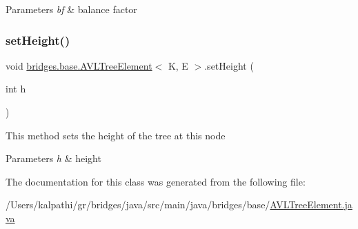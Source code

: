 \begin{DoxyParams}{Parameters}
{\em bf} & balance factor \\
\hline
\end{DoxyParams}
\mbox{\label{classbridges_1_1base_1_1_a_v_l_tree_element_ac42b744989ed7e18dcbd52980e674b33}} 
\subsubsection{\texorpdfstring{setHeight()}{setHeight()}}
{\footnotesize\ttfamily void \mbox{\hyperlink{classbridges_1_1base_1_1_a_v_l_tree_element}{bridges.\+base.\+A\+V\+L\+Tree\+Element}}$<$ K, E $>$.set\+Height (\begin{DoxyParamCaption}\item[{int}]{h }\end{DoxyParamCaption})}

This method sets the height of the tree at this node


\begin{DoxyParams}{Parameters}
{\em h} & height \\
\hline
\end{DoxyParams}


The documentation for this class was generated from the following file\+:\begin{DoxyCompactItemize}
\item 
/\+Users/kalpathi/gr/bridges/java/src/main/java/bridges/base/\mbox{\hyperlink{_a_v_l_tree_element_8java}{A\+V\+L\+Tree\+Element.\+java}}\end{DoxyCompactItemize}
